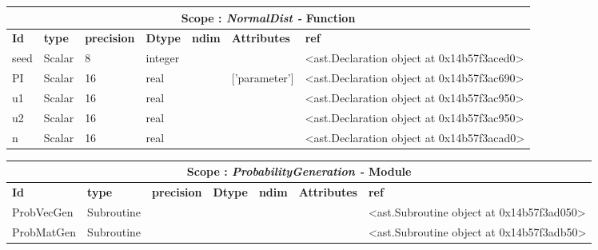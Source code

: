 \documentclass{report}
\begin{document}
\begin{center}
\begin{longtable}{|p{3.5cm}|p{1.5cm}|p{1.5cm}|p{1.5cm}|p{1cm}|p{2cm}|p{4cm}| }
\hline
\multicolumn{7}{|c|}{\textbf{Scope : \qquad}  \textbf{\textit{NormalDist - }Function}}\\ 
\hline
\textbf{Id} & \textbf{type} & \textbf{precision} & \textbf{Dtype} & \textbf{ndim} & \textbf{Attributes} & \textbf{ref} \\\hline

seed & Scalar & 8 & integer &  &  & <ast.Declaration object at 0x14b57f3aced0> \\\hline

PI & Scalar & 16 & real &  & ['parameter'] & <ast.Declaration object at 0x14b57f3ac690> \\\hline

u1 & Scalar & 16 & real &  &  & <ast.Declaration object at 0x14b57f3ac950> \\\hline

u2 & Scalar & 16 & real &  &  & <ast.Declaration object at 0x14b57f3ac950> \\\hline

n & Scalar & 16 & real &  &  & <ast.Declaration object at 0x14b57f3acad0> \\\hline

\end{longtable}
\end{center}

 \vspace{1cm}

\begin{center}
\begin{longtable}{|p{3.5cm}|p{1.5cm}|p{1.5cm}|p{1.5cm}|p{1cm}|p{2cm}|p{4cm}| }
\hline
\multicolumn{7}{|c|}{\textbf{Scope : \qquad}  \textbf{\textit{ProbabilityGeneration - }Module}}\\ 
\hline
\textbf{Id} & \textbf{type} & \textbf{precision} & \textbf{Dtype} & \textbf{ndim} & \textbf{Attributes} & \textbf{ref} \\\hline

ProbVecGen & Subroutine &  &  &  &  & <ast.Subroutine object at 0x14b57f3ad050> \\\hline

ProbMatGen & Subroutine &  &  &  &  & <ast.Subroutine object at 0x14b57f3adb50> \\\hline

\end{longtable}
\end{center}
\end{document}

